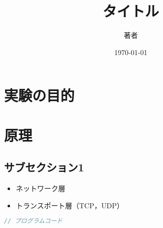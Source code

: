 \documentclass[lualatex,ja=standard]{bxjsarticle}
\title{タイトル}
\author{著者}
\date{\today}
\begin{document}


\setcounter{page}{1}


\section{実験の目的}


\section{原理}
\subsection{サブセクション1}

\begin{itemize}
\item ネットワーク層
\setlength{\parindent}{1em}



\vspace{1em}
\item トランスポート層（TCP，UDP）
\setlength{\parindent}{1em}



\end{itemize}


\begin{lstlisting}[language=C]
// プログラムコード

\end{lstlisting}
\end{document}
